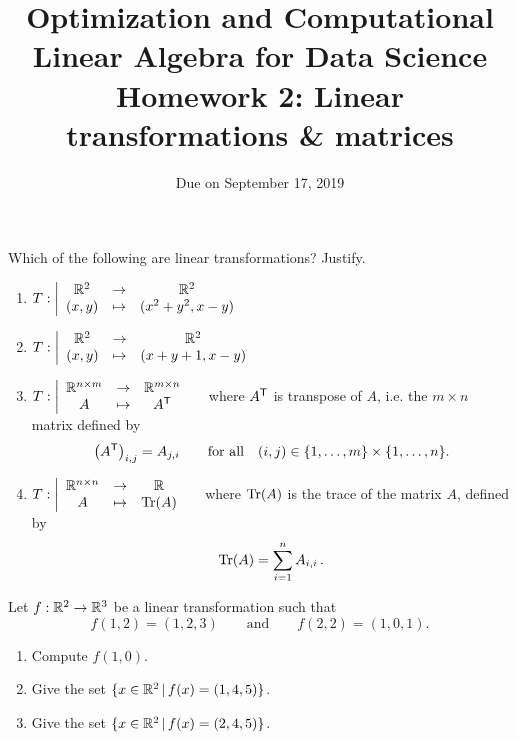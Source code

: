 \documentclass[11pt,nocut]{article}
\title{\vspace{-2.0cm}%
	Optimization and Computational Linear Algebra for Data Science\\
Homework 2: Linear transformations \& matrices}
\date{\vspace{-1cm}Due on September 17, 2019}
\begin{document}
\maketitle


\begin{problem}[2 points]
	Which of the following are linear transformations? Justify.
	\begin{enumerate}[label=\normalfont(\textbf{\alph*})]
		\item 
			$\displaystyle
			T: \left| 
			\begin{array}{ccc}
				\mathbb{R}^2 & \to & \mathbb{R}^2 \\
				(x,y) & \mapsto & (x^2+y^2, x-y)
			\end{array}
		\right.
		$
		\item 
			$\displaystyle
			T: \left| 
			\begin{array}{ccc}
				\mathbb{R}^2 & \to & \mathbb{R}^2 \\
				(x,y) & \mapsto & (x+y+1, x-y)
			\end{array}
		\right.
		$
	\item 
			$\displaystyle
			T: \left| 
			\begin{array}{ccc}
				\mathbb{R}^{n \times m} & \to & \mathbb{R}^{m \times n} \\
				A & \mapsto & A^{{\sf T}}
			\end{array}
		\right.
		\quad$ where $A^{{\sf T}}$ is transpose of $A$, i.e. the $m \times n$ matrix defined by
		$$
		\big(A^{{\sf T}}\big)_{i,j} = A_{j,i} \qquad \text{for all} \quad (i,j) \in \{1, \dots, m\}\times \{1, \dots, n\}.
		$$
	\item 
			$\displaystyle
			T: \left| 
			\begin{array}{ccc}
				\mathbb{R}^{n \times n} & \to & \mathbb{R} \\
				A & \mapsto & {{\rm Tr}}(A)
			\end{array}
		\right.\quad$ where ${{\rm Tr}}(A)$ is the trace of the matrix $A$, defined by 
		$${{\rm Tr}}(A) = \sum_{i=1}^n A_{i,i} \,.$$
	\end{enumerate}
\end{problem}


\begin{problem}[3 points]
	Let $f: \mathbb{R}^2 \to \mathbb{R}^3$ be a linear transformation such that
	$$
	f(1,2) = (1,2,3)
	\qquad \text{and} \qquad f(2,2) = (1,0,1).
	$$
	\begin{enumerate}[label=\normalfont(\textbf{\alph*})]
		\item Compute $f(1,0)$.
		\item Give the set $\{x \in \mathbb{R}^2 \, | \, f(x) = (1,4,5) \}$.
		\item Give the set $\{x \in \mathbb{R}^2 \, | \, f(x) = (2,4,5) \}$.
	\end{enumerate}
\end{problem}
\end{document}

